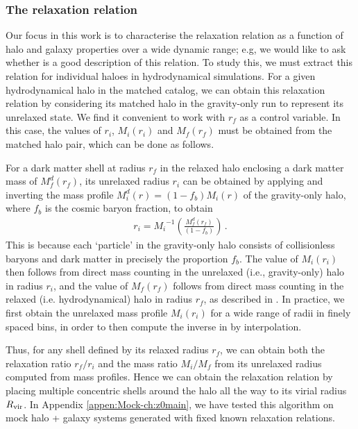 \subsubsection{The relaxation relation} %
\label{sec:methods-relx-reln-ch:z0main}
Our focus in this work is to characterise the relaxation relation  as a function of halo and galaxy properties over a wide dynamic range; e.g, we would like to ask whether  is a good description of this relation.
To study this, we must extract this relation for individual haloes in hydrodynamical simulations.
For a given hydrodynamical halo in the matched catalog, we can obtain this relaxation relation by considering its matched halo in the gravity-only run to represent its unrelaxed state. 
We find it convenient to work with $r_f$ as a control variable. In this case, the values of $r_i$, $M_i(r_i)$ and $M_f(r_f)$ must be obtained from the matched halo pair, which can be done as follows.

For a dark matter shell at radius $r_f$ in the relaxed halo enclosing a dark matter mass of $M_f^d(r_f)$, its unrelaxed radius $r_i$ can be obtained by applying  and inverting the mass profile $M_i^d(r)=(1-f_b) M_i(r)$ of the gravity-only halo, where $f_b$ is the cosmic baryon fraction, to obtain 
\begin{align}
\label{eq:inv-mass-ch:z0main}
r_i = {M_i}^{-1} \left( \frac{M_f^d(r_f)}{(1-f_b)} \right)\,.
\end{align}
This is because each `particle' in the gravity-only halo consists of collisionless baryons and dark matter in precisely the proportion $f_{b}$. 
The value of $M_i(r_i)$ then follows from direct mass counting in the unrelaxed (i.e., gravity-only) halo in radius $r_i$, and the value of $M_f(r_f)$ follows from direct mass counting in the relaxed (i.e. hydrodynamical) halo in radius $r_f$, as described in . In practice, we first obtain the unrelaxed mass profile $M_i(r_i)$ for a wide range of radii in finely spaced bins, in order to then compute the inverse in  by interpolation.

Thus, for any shell defined by its relaxed radius $r_f$, we can obtain both the relaxation ratio $r_f/r_i$ and the mass ratio $M_i/M_f$ from its unrelaxed radius computed from mass profiles. Hence we can obtain the relaxation relation by placing multiple concentric shells around the halo all the way to its virial radius $R_{\rm{vir}}$.
In Appendix \ref{appen:Mock-ch:z0main}, we have tested this algorithm on mock halo + galaxy systems generated with fixed known relaxation relations.









